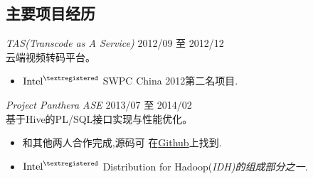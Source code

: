 \documentclass[line,margin]{res}
\begin{document}
\begin{resume}
\section{主要项目经历} 

                {\sl TAS(Transcode as A Service)} \hfill        2012/09 至 2012/12\\
                云端视频转码平台。
                  \begin{itemize}
                   \item $\textrm{Intel}^{\textregistered}$ SWPC China 2012第二名项目.
                   \end{itemize}
                   
                {\sl Project Panthera ASE} \hfill            2013/07 至 2014/02 \\
                基于Hive的PL/SQL接口实现与性能优化。
                 \begin{itemize}  \itemsep -2pt %
                 \item 和其他两人合作完成,源码可
                     在\href{https://github.com/intel-hadoop/project-panthera}{Github}上找到.
                 \item $\textrm{Intel}^{\textregistered}$ Distribution for Hadoop(\sl IDH)的组成部分之一.
                 \end{itemize}


\end{resume}
\end{document}
